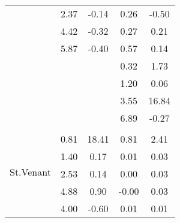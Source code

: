 \begin{table}
\begin{tabular}{c|cc|cc|}
\multicolumn{1}{|c|}{} & \multicolumn{1}{|c|}{      2.37} & \multicolumn{1}{|c|}{     -0.14} & \multicolumn{1}{|c|}{      0.26} & \multicolumn{1}{|c|}{     -0.50} \\ 
\multicolumn{1}{|c|}{} & \multicolumn{1}{|c|}{      4.42} & \multicolumn{1}{|c|}{     -0.32} & \multicolumn{1}{|c|}{      0.27} & \multicolumn{1}{|c|}{      0.21} \\ 
\multicolumn{1}{|c|}{} & \multicolumn{1}{|c|}{      5.87} & \multicolumn{1}{|c|}{     -0.40} & \multicolumn{1}{|c|}{      0.57} & \multicolumn{1}{|c|}{      0.14} \\ 
\multicolumn{1}{|c|}{} & \multicolumn{1}{|c|}{} & \multicolumn{1}{|c|}{} & \multicolumn{1}{|c|}{      0.32} & \multicolumn{1}{|c|}{      1.73} \\ 
\multicolumn{1}{|c|}{} & \multicolumn{1}{|c|}{} & \multicolumn{1}{|c|}{} & \multicolumn{1}{|c|}{      1.20} & \multicolumn{1}{|c|}{      0.06} \\ 
\multicolumn{1}{|c|}{} & \multicolumn{1}{|c|}{} & \multicolumn{1}{|c|}{} & \multicolumn{1}{|c|}{      3.55} & \multicolumn{1}{|c|}{     16.84} \\ 
\multicolumn{1}{|c|}{} & \multicolumn{1}{|c|}{} & \multicolumn{1}{|c|}{} & \multicolumn{1}{|c|}{      6.89} & \multicolumn{1}{|c|}{     -0.27} \\ 
\hline 
\multicolumn{1}{|c|}{\multirow{27}{*}{St.Venant}} &\multicolumn{1}{|c|}{} & \multicolumn{1}{|c|}{} & \multicolumn{1}{|c|}{} & \multicolumn{1}{|c|}{} \\ 
\multicolumn{1}{|c|}{} & \multicolumn{1}{|c|}{      0.81} & \multicolumn{1}{|c|}{     18.41} & \multicolumn{1}{|c|}{      0.81} & \multicolumn{1}{|c|}{      2.41} \\ 
\multicolumn{1}{|c|}{} & \multicolumn{1}{|c|}{      1.40} & \multicolumn{1}{|c|}{      0.17} & \multicolumn{1}{|c|}{      0.01} & \multicolumn{1}{|c|}{      0.03} \\ 
\multicolumn{1}{|c|}{} & \multicolumn{1}{|c|}{      2.53} & \multicolumn{1}{|c|}{      0.14} & \multicolumn{1}{|c|}{      0.00} & \multicolumn{1}{|c|}{      0.03} \\ 
\multicolumn{1}{|c|}{} & \multicolumn{1}{|c|}{      4.88} & \multicolumn{1}{|c|}{      0.90} & \multicolumn{1}{|c|}{     -0.00} & \multicolumn{1}{|c|}{      0.03} \\ 
\multicolumn{1}{|c|}{} & \multicolumn{1}{|c|}{      4.00} & \multicolumn{1}{|c|}{     -0.60} & \multicolumn{1}{|c|}{      0.01} & \multicolumn{1}{|c|}{      0.01} \\ 

\end{tabular}
\end{table}

